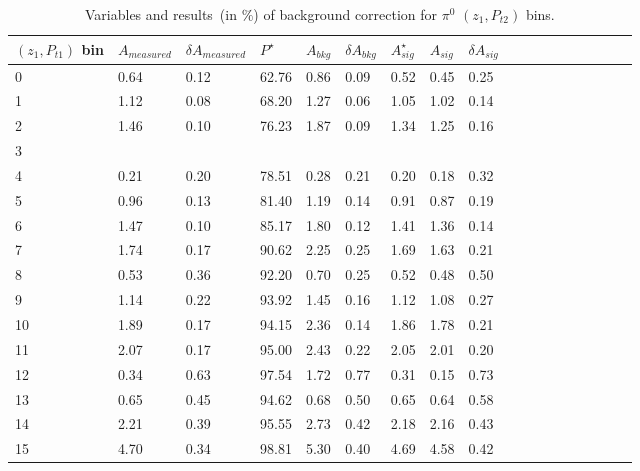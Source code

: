 \begin{table}[H]\footnotesize
\centering
\begin{tabular}{|l|l|l|l|l|l|l|l|l|l|l|l|l|l|l|l|l|l|}
\\ \hline
$(z_{1},P_{t1})$ bin & $A_{measured}$ & $\delta A_{measured}$ & $P^{\star}$ & $A_{bkg}$ & $\delta A_{bkg}$ & $A_{sig}^{\star}$ & $ A_{sig}$  & $\delta A_{sig}$ \\ \hline
0 & 0.64 & 0.12 & 62.76 & 0.86 & 0.09 & 0.52 & 0.45 & 0.25 \\ \hline 
1 & 1.12 & 0.08 & 68.20 & 1.27 & 0.06 & 1.05 & 1.02 & 0.14 \\ \hline 
2 & 1.46 & 0.10 & 76.23 & 1.87 & 0.09 & 1.34 & 1.25 & 0.16 \\ \hline 
3 &  &  &  &  &  &  &  &  \\ \hline 
4 & 0.21 & 0.20 & 78.51 & 0.28 & 0.21 & 0.20 & 0.18 & 0.32 \\ \hline 
5 & 0.96 & 0.13 & 81.40 & 1.19 & 0.14 & 0.91 & 0.87 & 0.19 \\ \hline 
6 & 1.47 & 0.10 & 85.17 & 1.80 & 0.12 & 1.41 & 1.36 & 0.14 \\ \hline 
7 & 1.74 & 0.17 & 90.62 & 2.25 & 0.25 & 1.69 & 1.63 & 0.21 \\ \hline 
8 & 0.53 & 0.36 & 92.20 & 0.70 & 0.25 & 0.52 & 0.48 & 0.50 \\ \hline 
9 & 1.14 & 0.22 & 93.92 & 1.45 & 0.16 & 1.12 & 1.08 & 0.27 \\ \hline 
10 & 1.89 & 0.17 & 94.15 & 2.36 & 0.14 & 1.86 & 1.78 & 0.21 \\ \hline 
11 & 2.07 & 0.17 & 95.00 & 2.43 & 0.22 & 2.05 & 2.01 & 0.20 \\ \hline 
12 & 0.34 & 0.63 & 97.54 & 1.72 & 0.77 & 0.31 & 0.15 & 0.73 \\ \hline 
13 & 0.65 & 0.45 & 94.62 & 0.68 & 0.50 & 0.65 & 0.64 & 0.58 \\ \hline 
14 & 2.21 & 0.39 & 95.55 & 2.73 & 0.42 & 2.18 & 2.16 & 0.43 \\ \hline 
15 & 4.70 & 0.34 & 98.81 & 5.30 & 0.40 & 4.69 & 4.58 & 0.42 \\ \hline 
\end{tabular}
\caption{Variables and results~(in $\%$) of background correction for $\pi^0$ $(z_1,P_{t2})$ bins.}
\label{tab:zptbkgcor}
\end{table}  

